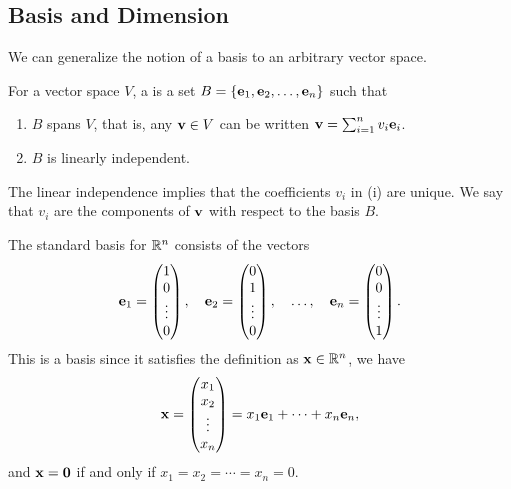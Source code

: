 \documentclass[a4paper]{scrartcl}
\begin{document}
\subsection{Basis and Dimension}

We can generalize the notion of a basis to an arbitrary vector space.

\begin{definition}[Basis]
    For a vector space $V$, a  is a set $B = \{\mathbf{e}_1, \mathbf{e}_2, \dots, \mathbf{e}_n \}$ such that
    \begin{enumerate}[label=(\roman*)]
        \item $B$ spans $V$, that is, any $\mathbf{v} \in V$ can be written $\mathbf{v} = \sum_{i = 1}^n v_i \mathbf{e}_i$.
        \item $B$ is linearly independent.
    \end{enumerate}
\end{definition}

The linear independence implies that the coefficients $v_i$ in (i) are unique. We say that $v_i$ are the components of $\mathbf{v}$ with respect to the basis $B$.

\begin{example}
    The standard basis for $\mathbb{R}^n$ consists of the vectors
    $$
\mathbf{e}_1 = \begin{pmatrix}1 \\ 0\\ \vdots \\ 0\end{pmatrix}, \quad \mathbf{e}_2 = \begin{pmatrix}0 \\ 1\\ \vdots \\ 0\end{pmatrix}, \quad \dots, \quad \mathbf{e}_n = \begin{pmatrix}0 \\ 0\\ \vdots \\ 1\end{pmatrix}.
    $$
    This is a basis since it satisfies the definition as $\mathbf{x} \in \mathbb{R}^n$, we have
    $$
\mathbf{x} = \begin{pmatrix}x_1 \\ x_2\\ \vdots \\ x_n\end{pmatrix} = x_1 \mathbf{e}_1 + \cdots + x_n \mathbf{e}_n,
    $$
    and $\mathbf{x} = \mathbf{0}$ if and only if $x_1 = x_2 = \cdots = x_n = 0$. 
\end{example}
\end{document}
